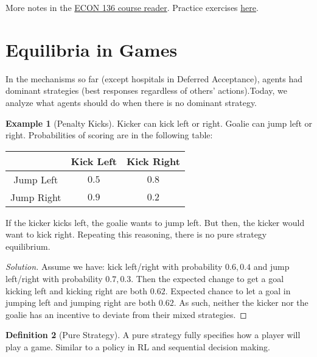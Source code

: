 \documentclass[dvipsnames]{article}
\theoremstyle{definition}
\newtheorem{definition}{Definition}[section]
\newtheorem{example}[definition]{Example}
\theoremstyle{remark}
\newenvironment{practice}{\begin{tcolorbox}[colback=blue!5!white,colframe=blue!75!black,title=Practice]}{\end{tcolorbox}}
\begin{document}
\begin{practice}
	More notes in the \href{https://flyingworkshop.github.io/market-design/book/house-allocation-and-kidney-exchange.html?highlight=top+trading#top-trading-cycles}{ECON 136 course reader}. Practice exercises \href{https://flyingworkshop.github.io/market-design/book/practice.html}{here}.
\end{practice}

\newpage

\section{Equilibria in Games}

In the mechanisms so far (except hospitals in Deferred Acceptance), agents had dominant strategies (best responses regardless of others' actions).Today, we analyze what agents should do when there is no dominant strategy. 

\begin{example}[Penalty Kicks]
	Kicker can kick left or right. Goalie can jump left or right. Probabilities of scoring are in the following table: 
	\begin{table}[h]\centering
		\begin{tabular}{c|c|c|}
			& Kick Left & Kick Right \\ \hline
			Jump Left & $0.5$ & $0.8$  \\ \hline
			Jump Right & $0.9$ & $0.2$ \\ \hline
		\end{tabular}
	\end{table}
	If the kicker kicks left, the goalie wants to jump left. 
	But then, the kicker would want to kick right. 
	Repeating this reasoning, there is no pure strategy equilibrium.
\end{example}

\begin{proof}[Solution]
	Assume we have: kick left/right with probability $0.6,0.4$ and jump left/right with probability $0.7,0.3$. Then the expected change to get a goal kicking left and kicking right are both $0.62$. Expected chance to let a goal in jumping left and jumping right are both $0.62$. As such, neither the kicker nor the goalie has an incentive to deviate from their mixed strategies. 
\end{proof}

\begin{definition}[Pure Strategy]
	A pure strategy fully specifies how a player will play a game. Similar to a policy in RL and sequential decision making.
\end{definition}
\end{document}
